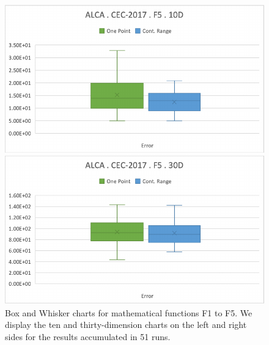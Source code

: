 \documentclass[graybox]{svmult}
\begin{document}
\begin{figure}[!ht]
\begin{minipage}[h]{0.49\linewidth}
        \end{minipage}
        \vfill
        \vspace{0.05 cm}
        \begin{minipage}[h]{0.49\linewidth}
            \includegraphics[width=1\linewidth]{img/fig_experiment_F5x10D.pdf} 
        \end{minipage}
        \hfill
        \begin{minipage}[h]{0.49\linewidth}
            \includegraphics[width=1\linewidth]{img/fig_experiment_F5x30D.pdf} 
        \end{minipage}       
        
        \caption{Box and Whisker charts for mathematical functions F1 to F5. We display the ten and thirty-dimension charts on the left and right sides for the results accumulated in 51 runs.} \label{fig.experiment_F1-F5}
    \end{figure}

    \FloatBarrier
\end{document}
